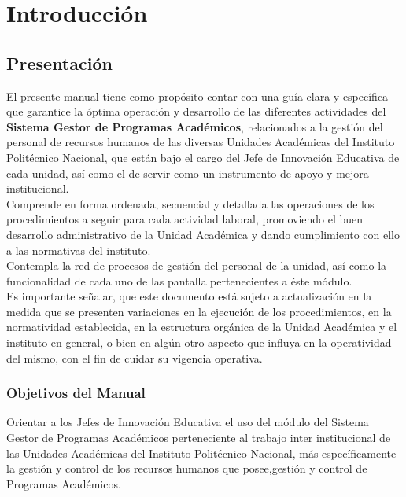 \chapter{Introducción}
\section{Presentación}
El presente manual tiene como propósito contar con una guía clara y específica que garantice la óptima operación y desarrollo de las diferentes actividades del \textbf{Sistema Gestor de Programas Académicos}, relacionados a la gestión del personal de recursos humanos de las diversas Unidades Académicas del Instituto Politécnico Nacional, que están bajo el cargo del Jefe de Innovación Educativa de cada unidad, así como el de servir como un instrumento de apoyo y mejora institucional.\\
    
Comprende en forma ordenada, secuencial y detallada las operaciones de los procedimientos a seguir para cada actividad laboral, promoviendo el buen desarrollo administrativo de la Unidad Académica y dando cumplimiento con ello a las normativas del instituto.\\
    
Contempla la red de procesos de gestión del personal de la unidad, así como la funcionalidad de cada uno de las pantalla pertenecientes a éste módulo.\\
    
Es importante señalar, que este documento está sujeto a actualización en la medida que se presenten variaciones en la ejecución de los procedimientos, en la normatividad establecida, en la estructura orgánica de la Unidad Académica y el instituto en general, o bien en algún otro aspecto que influya en la operatividad del mismo, con el fin de cuidar su vigencia operativa.\\

    \subsection{Objetivos del Manual}
    Orientar a los Jefes de Innovación Educativa el uso del módulo del Sistema Gestor de Programas Académicos perteneciente al trabajo inter institucional de las Unidades Académicas del Instituto Politécnico Nacional, más específicamente la gestión y control de los recursos humanos que posee,gestión y control de Programas Académicos.
    
